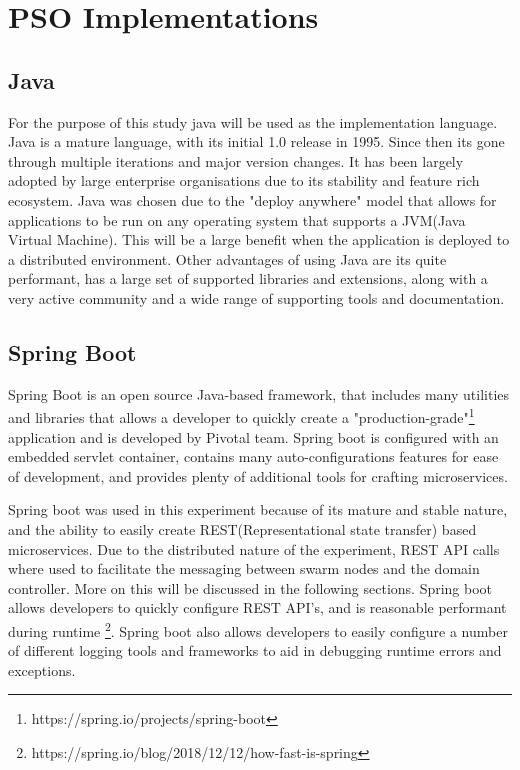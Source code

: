 \documentclass[oneside,12pt]{book}
\begin{document}
\section{PSO Implementations}

\subsection{Java}
For the purpose of this study java will be used as the implementation language. Java is a mature language, with its initial 1.0 release in 1995. Since then its gone through multiple iterations and major version changes. It has been largely adopted by large enterprise organisations due to its stability and feature rich ecosystem. Java was chosen due to the "deploy anywhere" model that allows for applications to be run on any operating system that supports a JVM(Java Virtual Machine). This will be a large benefit when the application is deployed to a distributed environment. Other advantages of using Java are its quite performant, has a large set of supported libraries and extensions, along with a very active community and a wide range of supporting tools and documentation.

\subsection{Spring Boot}
Spring Boot is an open source Java-based framework, that includes many utilities and libraries that allows a developer to quickly create a "production-grade"\footnote{https://spring.io/projects/spring-boot} application and is developed by Pivotal team. Spring boot is configured with an embedded servlet container, contains many auto-configurations features for ease of development, and provides plenty of additional tools for crafting microservices. 

Spring boot was used in this experiment because of its mature and stable nature, and the ability to easily create REST(Representational state transfer) based microservices. Due to the distributed nature of the experiment, REST API calls where used to facilitate the messaging between swarm nodes and the domain controller. More on this will be discussed in the following sections. Spring boot allows developers to quickly configure REST API's, and is reasonable performant during runtime \footnote{https://spring.io/blog/2018/12/12/how-fast-is-spring}. Spring boot also allows developers to easily configure a number of different logging tools and frameworks to aid in debugging runtime errors and exceptions.
\end{document}
